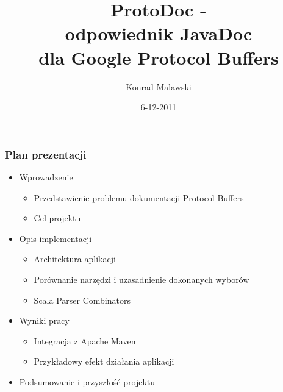 \documentclass{beamer}
\title[\textbf{ProtoDoc} - odpowiednik JavaDoc dla Google ProtoBuf]{ProtoDoc - \\ odpowiednik JavaDoc\\ dla Google Protocol Buffers}
\author[K. Malawski]{Konrad Malawski}
\date[2011]{6-12-2011}
\institute[AGH]
{Wydział Elektrotechniki, Automatyki, Informatyki i Elektroniki\\ Katedra Automatyki}
\begin{document}


{
 \begin{frame}
   \titlepage
 \end{frame}
}



\begin{frame}
\frametitle{Plan prezentacji}
 \begin{itemize}
  \item Wprowadzenie
         \begin{itemize}
          \item Przedstawienie problemu dokumentacji Protocol Buffers
	  \item Cel projektu
         \end{itemize}

  \pause \item Opis implementacji
	 \begin{itemize}
	  \item Architektura aplikacji
	  \item Porównanie narzędzi i uzasadnienie dokonanych wyborów
	  \item Scala Parser Combinators
	 \end{itemize}
  
   \pause \item Wyniki pracy
         \begin{itemize}
          \item Integracja z Apache Maven
          \item Przykładowy efekt działania aplikacji
         \end{itemize}
  \pause \item Podsumowanie i przyszłość projektu
 \end{itemize}
\end{frame}
\end{document}
